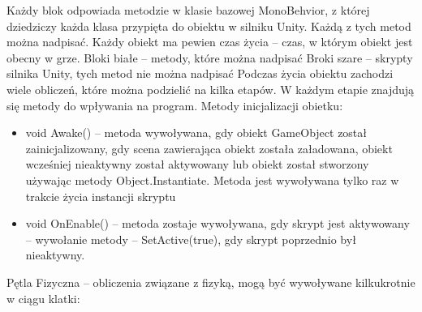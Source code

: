 \documentclass[12pt,twoside]{article}
\begin{document}
Każdy blok odpowiada metodzie w klasie bazowej MonoBehvior, z której dziedziczy
każda klasa przypięta do obiektu w silniku Unity. Każdą z tych metod można
nadpisać. Każdy obiekt ma pewien czas życia -- czas, w którym obiekt jest obecny
w grze. Bloki białe -- metody, które można nadpisać Broki szare -- skrypty silnika
Unity, tych metod nie można nadpisać Podczas życia obiektu zachodzi wiele
obliczeń, które można podzielić na kilka etapów. W każdym etapie znajdują się
metody do wpływania na program. Metody inicjalizacji obietku\cite{UnityFlow}:
\begin{itemize}

\item void Awake() -- metoda wywoływana, gdy obiekt GameObject został
zainicjalizowany, gdy scena zawierająca obiekt została załadowana, obiekt
wcześniej nieaktywny został aktywowany lub obiekt został stworzony używając
metody Object.Instantiate. Metoda jest wywoływana tylko raz w trakcie życia
instancji skryptu 
\item void OnEnable() -- metoda zostaje wywoływana, gdy skrypt jest aktywowany –
wywołanie metody -- SetActive(true), gdy skrypt poprzednio był nieaktywny. 
\end{itemize}
Pętla Fizyczna -- obliczenia związane z fizyką, mogą być wywoływane kilkukrotnie
w ciągu klatki:
\end{document}
